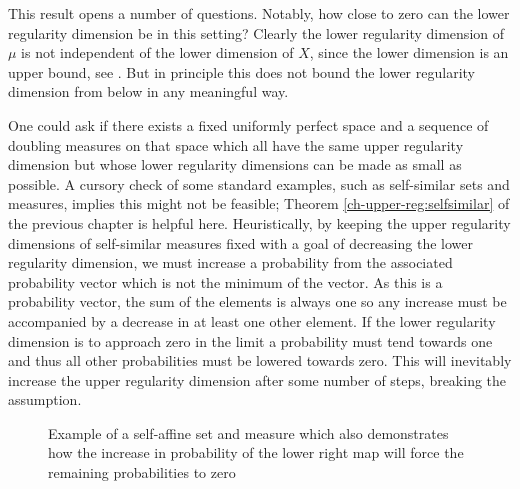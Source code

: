 This result opens a number of questions. Notably, how close to zero can the lower regularity dimension be in this setting? Clearly the lower regularity dimension of $\mu$ is not independent of the lower dimension of $X$, since the lower dimension is an upper bound, see \cite{bylund}. But in principle this does not bound the lower regularity dimension from below in any meaningful way. 

One could ask if there exists a fixed uniformly perfect space and a sequence of doubling measures on that space which all have the same upper regularity dimension but whose lower regularity dimensions can be made as small as possible. A cursory check of some standard examples, such as self-similar sets and measures, implies this might not be feasible; Theorem \ref{ch-upper-reg:selfsimilar} of the previous chapter is helpful here. Heuristically, by keeping the upper regularity dimensions of self-similar measures fixed with a goal of decreasing the lower regularity dimension, we must increase a probability from the associated probability vector which is not the minimum of the vector. As this is a probability vector, the sum of the elements is always one so any increase must be accompanied by a decrease in at least one other element. If the lower regularity dimension is to approach zero in the limit a probability must tend towards one and thus all other probabilities must be lowered towards zero. This will inevitably increase the upper regularity dimension after some number of steps, breaking the assumption.

\begin{figure}[h]
    \centering
    \caption{Example of a self-affine set and measure which also demonstrates how the increase in probability of the lower right map will force the remaining probabilities to zero}
    \label{fig:pathos-ex}
\end{figure}


